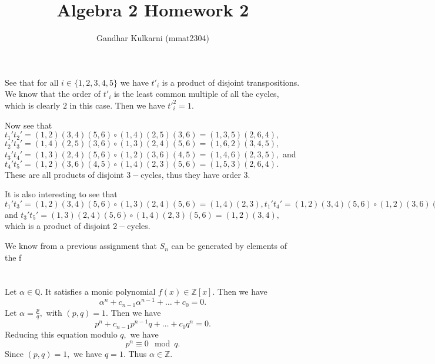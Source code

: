 \documentclass{article}
\title{Algebra 2 Homework 2} %
\author{Gandhar Kulkarni (mmat2304)} %
\date{} %
\begin{document}
 
\maketitle %


\section{} %
\section{} %
See that for all $i \in \{1,2,3,4,5\}$ we have $t'_i$ is a product of disjoint transpositions. We know that the order of $t'_i$ is the least common multiple 
of all the cycles, which is clearly $2$ in this case. Then we have ${t'}_i^2=1.$

Now see that $t_1't_2'= (1 ,2)(3 ,4)(5 ,6)\circ (1 ,4)(2, 5)(3, 6)=(1 ,3 ,5)(2, 6 ,4),$ $t_2't_3'=(1 ,4)(2, 5)(3, 6) \circ (1, 3)(2, 4)(5, 6)=(1, 6 ,2)(3, 
4, 5),$
$t_3't_4'= (1, 3)(2 ,4)(5 ,6) \circ (1, 2) (3, 6) (4, 5)=(1 ,4 ,6)(2, 3 ,5),$ and $t_4' t_5'= (1, 2) (3, 6) (4, 5) \circ (1, 4)(2, 3)(5, 6)=(1 ,5, 3)(2, 6, 
4).$ These are all 
products of disjoint $3-$cycles, thus they have order $3.$ 

It is also interesting to see that $t_1't_3'=(1 ,2)(3, 4)(5, 6)\circ (1, 3)(2, 4)(5 ,6)=(1 ,4)(2 ,3), t_1't_4'=(1 ,2)(3, 4)(5, 6)\circ (1 ,2) (3, 6) (4 ,5)= 
(3, 5 )(4 ,6), 
t_1't_5'=(1 ,2)(3, 4)(5, 6)\circ (1 ,4)(2, 3)(5, 6)= (1, 3)(2, 4), t_2't_4'=(1, 4)(2 ,5)(3, 6) \circ (1, 2) (3, 6) (4 ,5)=(1, 5)(2, 4), t_2't_5'=(1, 4)(2, 
5)(3, 6) \circ (1, 
4)(2, 3)(5 ,6)= (2 ,6)(3, 5),$ and $t_3't_5'= (1 ,3)(2, 4)(5, 6) \circ  (1 ,4)(2, 3)(5, 6)=(1 ,2)(3, 4),$ which is a product of disjoint $2-$cycles. 

We know from a previous assignment that $S_n$ can be generated by elements of the f
\section{} %
Let $\alpha \in \mathbb{Q}.$ It satisfies a monic polynomial $f(x) \in \mathbb{Z}[x].$ Then we have $$\alpha^n + c_{n-1}\alpha^{n-1} + \dots + c_0=0.$$
Let $\alpha=\frac{p}{q},$ with $(p,q)=1.$ Then we have $$p^n + c_{n-1}p^{n-1}q + \dots + c_0q^n=0.$$ Reducing this equation modulo $q,$ we have 
$$p^n \equiv 0 \mod q.$$ Since $(p,q)=1,$ we have $q=1.$ Thus $\alpha \in \mathbb{Z}.$
\end{document}
